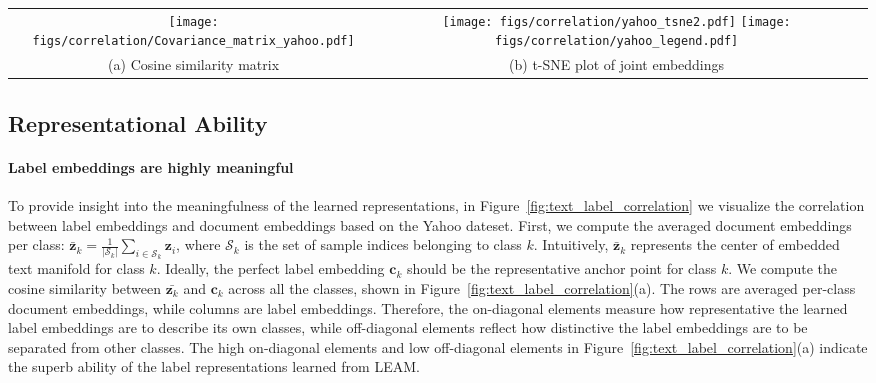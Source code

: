 \documentclass[11pt,a4paper]{article}
\newcommand{\Vmat}[0]{{{\bf V}}}
\newcommand{\cv}[0]{{\boldsymbol{c}}}
\newcommand{\zv}{\boldsymbol{z}}
\newcommand{\Scal}{\mathcal{S}}
\begin{document}
\begin{figure*}[t!] \centering
	\vspace{-0mm}
	\begin{tabular}{ccc}		
		\texttt{[image: figs/correlation/Covariance\_matrix\_yahoo.pdf]} & \hspace{-5mm}
		\texttt{[image: figs/correlation/yahoo\_tsne2.pdf]} 
		\texttt{[image: figs/correlation/yahoo\_legend.pdf]} 
		\\
		\hspace{-5mm}
		(a) Cosine similarity matrix \vspace{0mm}  & 
		\hspace{-15mm}
		(b) t-SNE plot of joint embeddings \hspace{-0mm}& 
	\end{tabular}
	\vspace{-2mm}
	\caption{Correlation between the learned text sequence representation $\zv$ and label embedding $\Vmat$. (a) Cosine similarity matrix between averaged $\bar{\zv}$ per class  and label embedding $\Vmat$, and (b) t-SNE plot of joint embedding of text $\zv$ and labels $\Vmat$. }
	\vspace{-2mm}
	\label{fig:text_label_correlation}
\end{figure*}


\subsection{Representational Ability}
\paragraph{Label embeddings are highly meaningful} 
To provide insight into the meaningfulness of the learned representations, in Figure~\ref{fig:text_label_correlation} we  visualize the correlation between label embeddings and document embeddings based on the Yahoo dateset. First, we compute the averaged document embeddings per class: 
$\bar{\zv}_k =  \frac{1}{ |\Scal_k| }  \sum_{i \in \Scal_k}\zv_i$, 
where $\Scal_k$ is the set of sample indices  belonging to class $k$. Intuitively, $\bar{\zv}_k$ represents the center of embedded text manifold for class $k$. Ideally, the perfect label embedding $\cv_k$ should be the representative anchor point for class $k$. We compute the cosine similarity between $\bar{\zv_k}$ and $\cv_k$ across all the classes, shown in Figure~\ref{fig:text_label_correlation}(a). The rows are averaged per-class document embeddings, while columns are label embeddings. Therefore, the on-diagonal elements measure how representative the learned label embeddings are to describe its own classes, while off-diagonal elements reflect how distinctive the label embeddings are to be separated from other classes. The high on-diagonal elements and low off-diagonal elements in Figure~\ref{fig:text_label_correlation}(a) indicate the superb ability of the label representations learned from LEAM.
\end{document}
